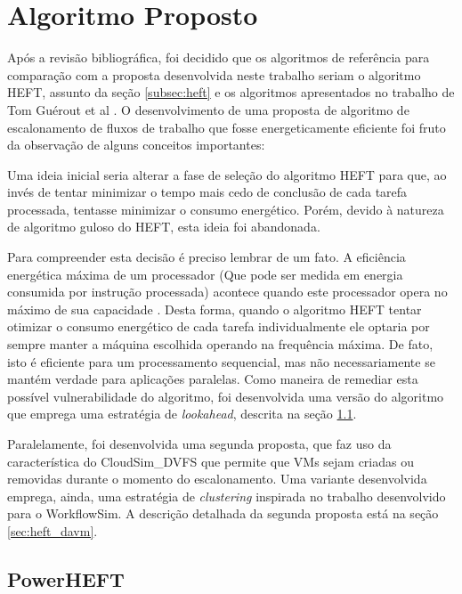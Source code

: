 \chapter{Algoritmo Proposto}
\label{cap:algoritmo}

Após a revisão bibliográfica, foi decidido que os algoritmos de referência para
comparação com a proposta desenvolvida neste trabalho seriam o algoritmo HEFT,
assunto da seção \ref{subsec:heft} e os algoritmos apresentados no trabalho de
Tom Guérout et al \cite{guerout:energy_aware_simulation}. O desenvolvimento de
uma proposta de algoritmo de escalonamento de fluxos de trabalho que fosse
energeticamente eficiente foi fruto da observação de alguns conceitos
importantes:

Uma ideia inicial seria alterar a fase de seleção do algoritmo HEFT para que, ao
invés de tentar minimizar o tempo mais cedo de conclusão de cada tarefa
processada, tentasse minimizar o consumo energético. Porém, devido à natureza de
algoritmo guloso do HEFT, esta ideia foi abandonada.

Para compreender esta decisão é preciso lembrar de um fato. A eficiência
energética máxima de um processador (Que pode ser medida em energia consumida
por instrução processada) acontece quando este processador opera no máximo de
sua capacidade \cite{barroso:case_energy_proportional}. Desta forma, quando o
algoritmo HEFT tentar otimizar o consumo energético de cada tarefa
individualmente ele optaria por sempre manter a máquina escolhida operando na
frequência máxima. De fato, isto é eficiente para um processamento sequencial,
mas não necessariamente se mantém verdade para aplicações paralelas. Como
maneira de remediar esta possível vulnerabilidade do algoritmo, foi desenvolvida
uma versão do algoritmo que emprega uma estratégia de \emph{lookahead}, descrita
na seção \ref{sec:proposta_inicial}.

Paralelamente, foi desenvolvida uma segunda proposta, que faz uso da
característica do CloudSim\_DVFS que permite que VMs sejam criadas ou removidas
durante o momento do escalonamento. Uma variante desenvolvida emprega, ainda,
uma estratégia de \emph{clustering} inspirada no trabalho desenvolvido para o
WorkflowSim. A descrição detalhada da segunda proposta está na seção
\ref{sec:heft_davm}.

\section{PowerHEFT}
\label{sec:proposta_inicial}

